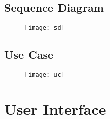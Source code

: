 \newpage
\subsection{Sequence Diagram}
\begin{figure}[h]
    \begin{center}
        \texttt{[image: sd]}
    \end{center}
\centering
\end{figure}


\newpage
\subsection{Use Case}
\begin{figure}[h]
    \begin{center}
        \texttt{[image: uc]}
    \end{center}
\centering
\end{figure}


\newpage
\section{User Interface}
\begin{figure}[h]
    \centering
    \begin{minipage}{0.45\textwidth}
        \centering
{%
\setlength{\fboxsep}{0pt}%
\setlength{\fboxrule}{1pt}%
\fbox{\texttt{[image: a1]}}%
}%
    \end{minipage}
    \hfill
    \begin{minipage}{0.45\textwidth}
        \centering
{%
\setlength{\fboxsep}{0pt}%
\setlength{\fboxrule}{1pt}%
\fbox{\texttt{[image: a2]}}%
}%
    \end{minipage}
\end{figure}




\begin{figure}[htbp]
    \centering

    \begin{minipage}[b]{0.45\textwidth}
        \centering
{%
\setlength{\fboxsep}{0pt}%
\setlength{\fboxrule}{1pt}%
\fbox{\texttt{[image: a4]}}%
}%
    \end{minipage}
    \hfill
    \begin{minipage}[b]{0.45\textwidth}
        \centering
{%
\setlength{\fboxsep}{0pt}%
\setlength{\fboxrule}{1pt}%
\fbox{\texttt{[image: a5]}}%
}%
    \end{minipage}
\end{figure}





